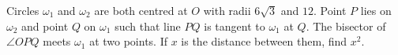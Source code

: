 Circles $\omega_1$ and $\omega_2$ are both centred at $O$ with radii $6\sqrt3$ and $12$. Point $P$ lies on $\omega_2$ and point $Q$ on $\omega_1$ such that line $PQ$ is tangent to $\omega_1$ at $Q$. The bisector of $\angle OPQ$ meets $\omega_1$ at two points. If $x$ is the distance between them, find $x^2$.
